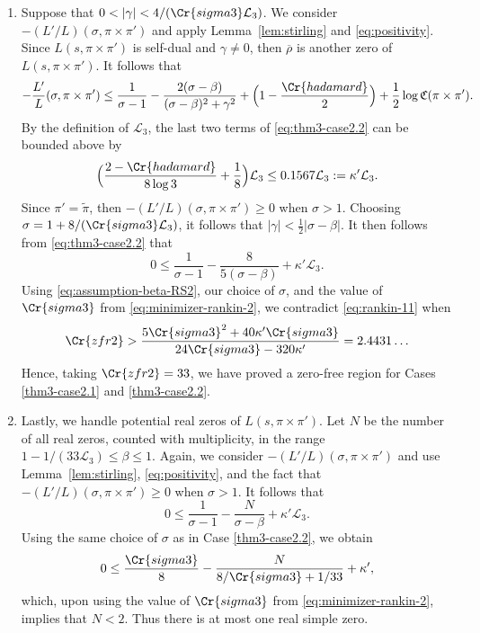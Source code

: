 \documentclass[12pt,reqno]{amsart}
\renewcommand{\tilde}{\widetilde}
\theoremstyle{remark}
\renewcommand{\tilde}{\widetilde}
\renewcommand{\tilde}{\widetilde}
\numberwithin{equation}{section}
\begin{document}
\begin{enumerate}[ leftmargin=1cm]
    \item\label{thm3-case2.2} Suppose that $0 < |\gamma| < {4}/({\Cr{sigma3}\mathcal{L}_3})$. We consider $-(L'/L)(\sigma, \pi \times \pi')$ and apply Lemma~\ref{lem:stirling} and  \eqref{eq:positivity}. Since $L(s,\pi \times \pi')$ is self-dual and $\gamma \neq 0$, then $\overline{\rho}$ is another zero of $L(s,\pi \times \pi')$. It follows that 
    \begin{equation}\label{eq:thm3-case2.2}
        -\frac{L'}{L}(\sigma, \pi \times \pi') \le \frac{1}{\sigma-1} - \frac{2(\sigma-\beta)}{(\sigma-\beta)^2+\gamma^2} + \Big(1-\frac{\Cr{hadamard}}{2}\Big)+ \frac{1}{2}\log \mathfrak{C}(\pi \times \pi').
    \end{equation}
        By the definition of $\mathcal{L}_3$, the last two terms of \eqref{eq:thm3-case2.2} can be bounded above by
        \[
        \Big(\frac{2-\Cr{hadamard}}{8\log 3} + \frac{1}{8}\Big) \mathcal{L}_3 \le 0.1567\mathcal{L}_3 := \kappa'\mathcal{L}_3. %
        \]
         Since $\pi' = \tilde{\pi}$, then $-(L'/L)(\sigma, \pi \times \pi') \ge 0$ when $\sigma > 1$. Choosing $\sigma = 1 + {8}/({\Cr{sigma3}\mathcal{L}_3})$, it follows that  $|\gamma| < \frac{1}{2}|\sigma-\beta|$. It then follows from \eqref{eq:thm3-case2.2} that
        \begin{equation}\label{eq:rankin-11}
         0 \le \frac{1}{\sigma-1} -\frac{8}{5(\sigma-\beta)}
        +  \kappa'\mathcal{L}_3.
        \end{equation}
        Using \eqref{eq:assumption-beta-RS2}, our choice of $\sigma$, and the value of $\Cr{sigma3}$ from \eqref{eq:minimizer-rankin-2}, we contradict \eqref{eq:rankin-11} when 
        \[
        \Cr{zfr2} > \frac{5\Cr{sigma3}^2+40\kappa'\Cr{sigma3}}{24\Cr{sigma3}-320\kappa'} =  2.4431\ldots
        \]
        Hence, taking $\Cr{zfr2} = 33$, we have proved a zero-free region for Cases \eqref{thm3-case2.1} and \eqref{thm3-case2.2}.
    
        \item 
        
        Lastly, we handle potential real zeros of $L(s, \pi \times \pi')$.
        Let $N$ be the number of all real zeros, counted with multiplicity, in the range $1- 1/(33\mathcal{L}_3) \le \beta \le 1$. Again, we consider $-(L'/L)(\sigma, \pi \times \pi')$ and use Lemma~\ref{lem:stirling}, \eqref{eq:positivity}, and the fact that $-(L'/L)(\sigma, \pi \times \pi') \ge 0$ when $\sigma >1$. It follows that
        \[
        0 \le \frac{1}{\sigma-1}-\frac{N}{\sigma-\beta}+\kappa'\mathcal{L}_3.
        \]
        Using the same choice of $\sigma$ as in Case \eqref{thm3-case2.2}, we obtain
        \[
        0 \le \frac{\Cr{sigma3}}{8}-\frac{N}{8/\Cr{sigma3}+1/33}+\kappa',
        \]
        which, upon using the value of $\Cr{sigma3}$ from \eqref{eq:minimizer-rankin-2}, implies that $N < 2$. Thus there is at most one real simple zero.
    \end{enumerate}
\end{document}
